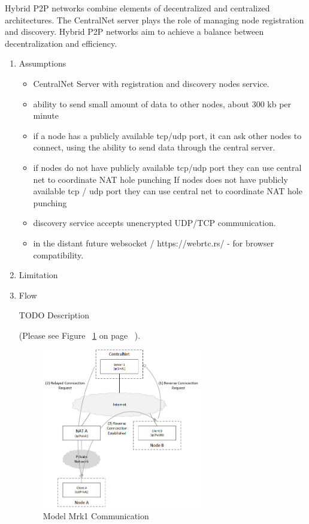 \begin{enumerate}
Hybrid P2P networks combine elements of decentralized and centralized architectures.
The CentralNet server plays the role of managing node registration and discovery.
Hybrid P2P networks aim to achieve a balance between decentralization and efficiency.

\begin{enumerate}

\item Assumptions

\begin{itemize}

\item CentralNet Server with registration and discovery nodes service.

\item ability to send small amount of data to other nodes, about 300 kb per minute

\item if a node has a publicly available tcp/udp port, it can ask other nodes to connect,
using the ability to send data through the central server.

\item if nodes do not have publicly available tcp/udp port they can use central net to coordinate NAT hole punching
If nodes does not have publicly available tcp / udp port they can use central net to coordinate NAT hole punching

\item discovery service accepts unencrypted UDP/TCP communication.

\item in the distant future websocket / https://webrtc.rs/ - for browser compatibility.

\end{itemize} 

\item Limitation 

\item Flow

TODO Description

(Please see Figure ~\ref{fig:MM1C} on page ~\pageref{fig:MM1C}).

\begin{figure}[H]
    \centering
    \includegraphics[width=7cm,angle=0]{./diag/Issue/NATReversal-Mk1-Issue.png}
	\caption{Model Mrk1 Communication}
    \label{fig:MM1C}
\end{figure}


\end{enumerate}
\end{enumerate}
